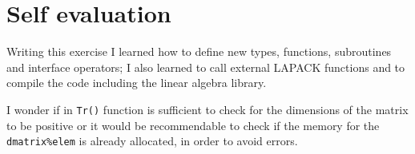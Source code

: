 \documentclass[a4paper]{article}
\begin{document}
\section*{Self evaluation}
Writing this exercise I learned how to define new types, functions, subroutines and interface operators; I also learned to call external LAPACK functions and to compile the code including the linear algebra library.

\noindent I wonder if in \lstinline{Tr()} function is sufficient to check for the dimensions of the matrix to be positive or it would be recommendable to check if the memory for the \lstinline{dmatrix%elem} is already allocated, in order to avoid errors.
\end{document}
